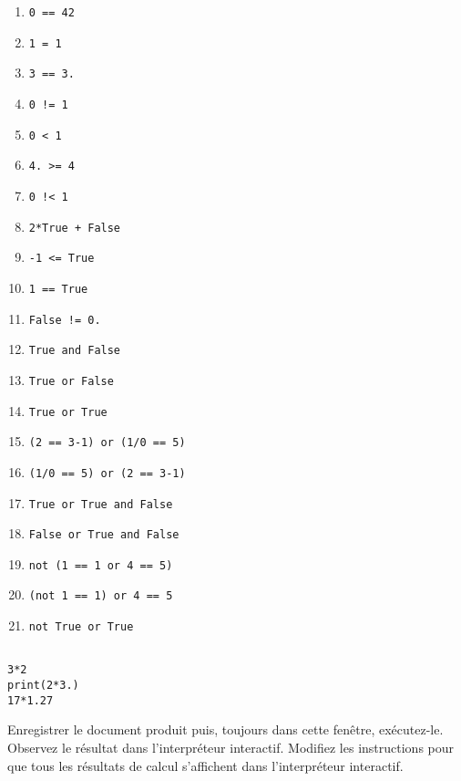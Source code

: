 \begin{multicols}{2}
  \begin{enumerate}[label=\emph{\alph*)}]
    \item \texttt{0 == 42}
    \item \texttt{1 = 1}
    \item \texttt{3 == 3.}
    \item \texttt{0 != 1}
    \item \texttt{0 < 1}
    \item \texttt{4. >= 4}
    \item \texttt{0 !< 1}
    \item \texttt{2*True + False}
    \item \texttt{-1 <= True}
    \item \texttt{1 == True}
    \item \texttt{False != 0.}
    \item \texttt{True and False}
    \item \texttt{True or False}
    \item \texttt{True or True}
    \item \texttt{(2 == 3-1) or (1/0 == 5)}
    \item \texttt{(1/0 == 5) or (2 == 3-1)}
    \item \texttt{True or True and False}
    \item \texttt{False or True and False}    
    \item \texttt{not (1 == 1 or 4 == 5)}
    \item \texttt{(not 1 == 1) or 4 == 5}
    \item \texttt{not True or True}
  \end{enumerate}
\end{multicols}

\begin{lstlisting}

3*2
print(2*3.)
17*1.27
\end{lstlisting}

Enregistrer le document produit puis, toujours dans cette fenêtre, exécutez-le. 
Observez le résultat dans l'interpréteur interactif. 
Modifiez les instructions pour que tous les résultats de calcul s'affichent dans l'interpréteur interactif.
